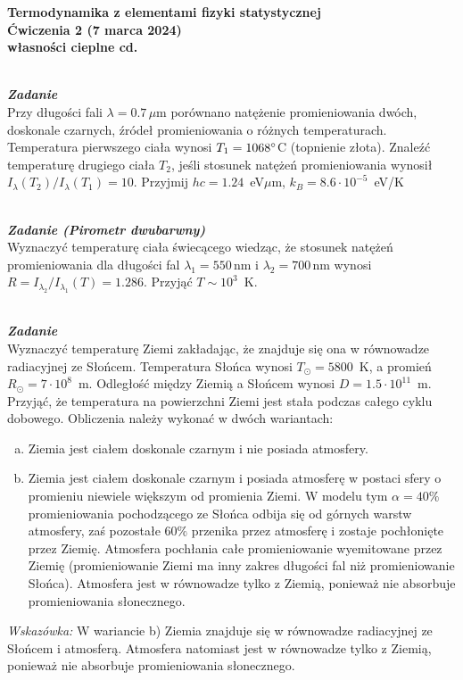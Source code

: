 \documentclass[11pt,a4paper]{article}
\newcounter{zadanie}\newcommand{\zadanie}[1][]{\addtocounter{zadanie}{1} ~\\  {\bf \emph{Zadanie \arabic{zadanie} #1 }} \\}
\begin{document}
\vspace*{-1.8cm}

\begin{centering}
\bf{\Large{Termodynamika z elementami fizyki statystycznej}}\\
Ćwiczenia 2 (7 marca 2024)\\[1mm]
własności cieplne cd. \\
\end{centering}

\zadanie
Przy długości fali $\lambda = 0.7\,\mu$m porównano natężenie promieniowania dwóch,
doskonale czarnych, źródeł promieniowania o różnych temperaturach.
Temperatura pierwszego ciała wynosi $T_1 = 1068 \degree$C (topnienie złota). 
Znaleźć temperaturę drugiego ciała $T_2$, jeśli stosunek natężeń promieniowania 
wynosił $I_\lambda (T_2)/I_\lambda (T_1) = 10$.
Przyjmij $hc = 1.24$~eV$\mu$m, $k_{B} = 8.6\cdot 10^{-5}$~eV/K

\zadanie [(Pirometr dwubarwny)]
Wyznaczyć temperaturę ciała świecącego wiedząc, że stosunek natężeń promieniowania dla długości fal
$\lambda_1=550$\,nm i $\lambda_2=700$\,nm wynosi $R=I_{\lambda_2}/I_{\lambda_1}(T)=1.286$.
Przyjąć $T \sim 10^{3}$~K.

\zadanie

Wyznaczyć temperaturę Ziemi zakładając, że znajduje się ona w równowadze radiacyjnej ze
Słońcem. Temperatura Słońca wynosi $T_\odot = 5800$~K, a promień $R_\odot = 7 \cdot 10^8$~m.
Odległość między Ziemią a Słońcem wynosi $D = 1.5 \cdot 10^{11}$~m. 
Przyjąć, że temperatura na powierzchni Ziemi jest stała podczas całego cyklu dobowego.
Obliczenia należy wykonać w dwóch wariantach:\\
\begin{enumerate}[a)]
        \item Ziemia jest ciałem doskonale czarnym i nie posiada atmosfery.
        \item Ziemia jest ciałem doskonale czarnym i posiada atmosferę w postaci sfery o promieniu niewiele większym od promienia Ziemi. 
        W modelu tym $\alpha=40\%$ promieniowania pochodzącego ze Słońca odbija się od górnych warstw atmosfery, zaś pozostałe $60\%$ 
        przenika przez atmosferę i zostaje pochłonięte przez Ziemię. Atmosfera pochłania całe promieniowanie wyemitowane przez Ziemię
  (promieniowanie Ziemi ma inny zakres długości fal niż promieniowanie Słońca). Atmosfera jest w równowadze tylko z Ziemią, 
  ponieważ nie absorbuje promieniowania słonecznego.
\end{enumerate}
{\it Wskazówka: }
W wariancie b) Ziemia znajduje się w równowadze radiacyjnej ze Słońcem i atmosferą. 
Atmosfera natomiast jest w równowadze tylko z Ziemią, ponieważ nie absorbuje promieniowania słonecznego.
\end{document}
